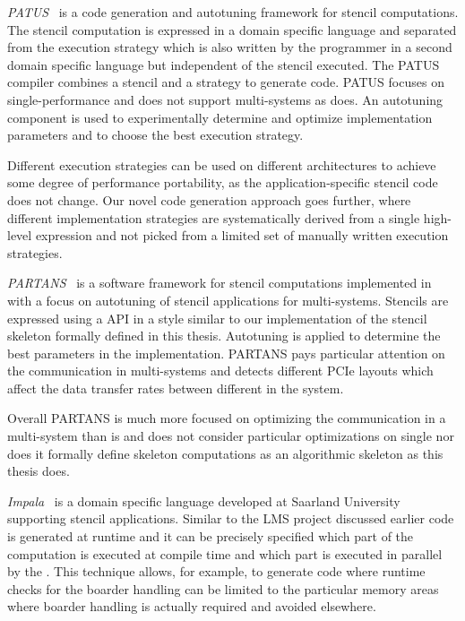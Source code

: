 \bigskip

\emph{PATUS}~\cite{ChristenSB11} is a code generation and autotuning framework for stencil computations.
The stencil computation is expressed in a domain specific language and separated from the execution strategy which is also written by the programmer in a second domain specific language but independent of the stencil executed.
The PATUS compiler combines a stencil and a strategy to generate \OpenCL code.
PATUS focuses on single-\GPU performance and does not support multi-\GPU systems as \SkelCL does.
An autotuning component is used to experimentally determine and optimize implementation parameters and to choose the best execution strategy.

Different execution strategies can be used on different architectures to achieve some degree of performance portability, as the application-specific stencil code does not change.
Our novel code generation approach goes further, where different implementation strategies are systematically derived from a single high-level expression and not picked from a limited set of manually written execution strategies.

\bigskip

\emph{PARTANS}~\cite{LutzFC13} is a software framework for stencil computations implemented in \Cpp with a focus on autotuning of stencil applications for multi-\GPU systems.
Stencils are expressed using a \Cpp API in a style similar to our \SkelCL \Cpp implementation of the stencil skeleton formally defined in this thesis.
Autotuning is applied to determine the best parameters in the implementation.
PARTANS pays particular attention on the communication in multi-\GPU systems and detects different PCIe layouts which affect the data transfer rates between different \GPUs in the system.

Overall PARTANS is much more focused on optimizing the communication in a multi-\GPU system than \SkelCL is and does not consider particular optimizations on single \GPUs nor does it formally define skeleton computations as an algorithmic skeleton as this thesis does.

\bigskip
\emph{Impala}~\cite{KosterLHMS14} is a domain specific language developed at Saarland University supporting stencil applications.
Similar to the LMS project discussed earlier code is generated at runtime and it can be precisely specified which part of the computation is executed at compile time and which part is executed in parallel by the \GPU.
This technique allows, for example, to generate \GPU code where runtime checks for the boarder handling can be limited to the particular memory areas where boarder handling is actually required and avoided elsewhere.

